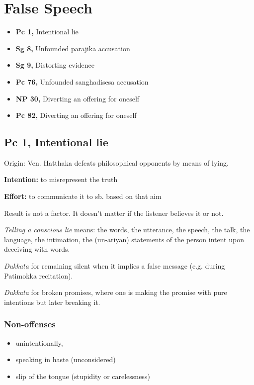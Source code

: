 \chapter{False Speech}

\begin{itemize}
\tightlist
\item
  \textbf{Pc 1,} Intentional lie
\item
  \textbf{Sg 8,} Unfounded parajika accusation
\item
  \textbf{Sg 9,} Distorting evidence
\item
  \textbf{Pc 76,} Unfounded sanghadisesa accusation
\item
  \textbf{NP 30,} Diverting an offering for oneself
\item
  \textbf{Pc 82,} Diverting an offering for oneself
\end{itemize}

\section{Pc 1, Intentional lie}

Origin: Ven. Hatthaka defeats philosophical opponents by means of lying.

\textbf{Intention:} to misrepresent the truth

\textbf{Effort:} to communicate it to sb. based on that aim

Result is not a factor. It doesn't matter if the listener believes it or
not.

\emph{Telling a conscious lie} means: the words, the utterance, the
speech, the talk, the language, the intimation, the (un-ariyan)
statements of the person intent upon deceiving with words.

\emph{Dukkata} for remaining silent when it implies a false message
(e.g. during Patimokka recitation).

\emph{Dukkata} for broken promises, where one is making the promise with
pure intentions but later breaking it.

\subsection{Non-offenses}

\begin{itemize}
\tightlist
\item
  unintentionally,
\item
  speaking in haste (unconsidered)
\item
  slip of the tongue (stupidity or carelessness)
\end{itemize}

